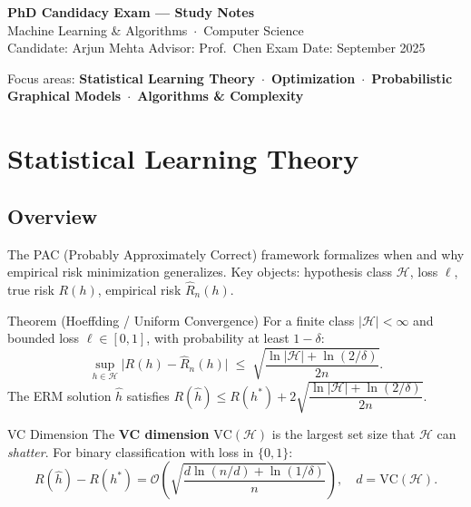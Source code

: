 \documentclass[10pt, letterpaper]{article}
\newcommand{\term}[1]{\textbf{\color{accent}#1}}
\newcommand{\bigO}[1]{\mathcal{O}\!\left(#1\right)}
\begin{document}
\begin{tcolorbox}[
  enhanced,
  colback=accent,
  coltext=white,
  colframe=accent,
  arc=4pt,
  boxrule=0pt,
  left=10pt, right=10pt, top=8pt, bottom=8pt
]
  {\large\bfseries PhD Candidacy Exam — Study Notes}\\[3pt]
  {\normalsize Machine Learning \& Algorithms\ $\cdot$\ Computer Science}\\[2pt]
  {\small\color{white!80!accent} Candidate: Arjun Mehta\quad
   Advisor: Prof.\ Chen\quad
   Exam Date: September 2025}
\end{tcolorbox}

\vspace{6pt}
{\small\color{neutral}
  Focus areas: \textbf{Statistical Learning Theory}\ $\cdot$\
  \textbf{Optimization}\ $\cdot$\
  \textbf{Probabilistic Graphical Models}\ $\cdot$\
  \textbf{Algorithms \& Complexity}
}

\section{Statistical Learning Theory}

\subsection{Overview}
The PAC (Probably Approximately Correct) framework formalizes when and why empirical risk
minimization generalizes. Key objects: hypothesis class $\mathcal{H}$, loss $\ell$,
true risk $R(h)$, empirical risk $\hat{R}_n(h)$.

\begin{keyresult}{Theorem (Hoeffding / Uniform Convergence)}
For a finite class $|\mathcal{H}|<\infty$ and bounded loss
$\ell\in[0,1]$, with probability at least $1-\delta$:
\[
  \sup_{h\in\mathcal{H}}\bigl|R(h)-\hat{R}_n(h)\bigr|
  \;\le\; \sqrt{\frac{\ln|\mathcal{H}|+\ln(2/\delta)}{2n}}.
\]
The ERM solution $\hat{h}$ satisfies
$R(\hat{h}) \le R(h^*) + 2\sqrt{\dfrac{\ln|\mathcal{H}|+\ln(2/\delta)}{2n}}$.
\end{keyresult}

\begin{defbox}{VC Dimension}
The \term{VC dimension} $\mathrm{VC}(\mathcal{H})$ is the largest set size that
$\mathcal{H}$ can \emph{shatter}. For binary classification with loss in $\{0,1\}$:
\[
  R(\hat{h})-R(h^*) = \bigO{\sqrt{\frac{d\ln(n/d)+\ln(1/\delta)}{n}}},
  \quad d = \mathrm{VC}(\mathcal{H}).
\]
\end{defbox}
\end{document}
